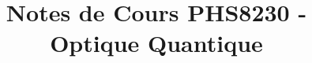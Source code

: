 \documentclass[letterpaper,oneside]{tufte-handout}
\title{Notes de Cours PHS8230 - Optique Quantique}
\begin{document}
\maketitle

\nocite{*}


\end{document}
